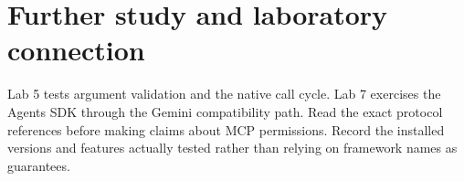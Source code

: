 \section{Further study and laboratory connection}
Lab 5 tests argument validation and the native call cycle. Lab 7 exercises the Agents SDK through the Gemini compatibility path. Read the exact protocol references \cite{mcp-spec,mcp-roots} before making claims about MCP permissions. Record the installed versions and features actually tested rather than relying on framework names as guarantees.

